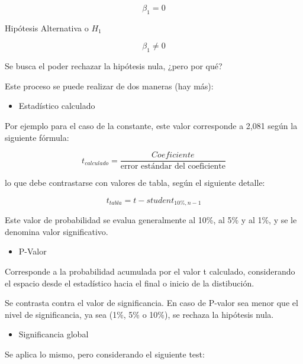 \documentclass[
  letterpaper,
  DIV=11,
  numbers=noendperiod]{scrartcl}
\providecommand{\tightlist}{%
  \setlength{\itemsep}{0pt}\setlength{\parskip}{0pt}}\usepackage{longtable,booktabs,array}
\begin{document}
\begin{equation}
\beta_{1} = 0
\end{equation}

Hipótesis Alternativa o \(H_{1}\)

\begin{equation}
\beta_{1} \neq 0
\end{equation}

Se busca el poder rechazar la hipótesis nula, ¿pero por qué?

Este proceso se puede realizar de dos maneras (hay más):

\begin{itemize}
\tightlist
\item
  Estadístico calculado
\end{itemize}

Por ejemplo para el caso de la constante, este valor corresponde a 2,081
según la siguiente fórmula:

\begin{equation}
t_{calculado} = \frac{Coeficiente}{\text{error estándar del coeficiente}}
\end{equation}

lo que debe contrastarse con valores de tabla, según el siguiente
detalle:

\begin{equation}
t_{tabla} = t-student_{10\%, n - 1}
\end{equation}

Este valor de probabilidad se evalua generalmente al 10\%, al 5\% y al
1\%, y se le denomina valor significativo.

\begin{itemize}
\tightlist
\item
  P-Valor
\end{itemize}

Corresponde a la probabilidad acumulada por el valor t calculado,
considerando el espacio desde el estadístico hacia el final o inicio de
la distibución.

Se contrasta contra el valor de significancia. En caso de P-valor sea
menor que el nivel de significancia, ya sea (1\%, 5\% o 10\%), se
rechaza la hipótesis nula.

\begin{itemize}
\tightlist
\item
  Significancia global
\end{itemize}

Se aplica lo mismo, pero considerando el siguiente test:
\end{document}
